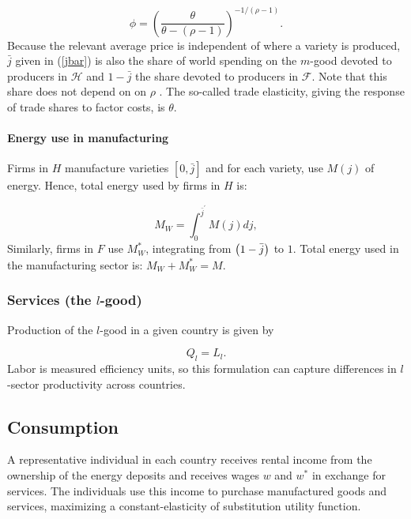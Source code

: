 \documentclass[notitlepage,12pt]{article}
\begin{document}
\begin{equation*}
\phi =\left( \frac{\theta }{\theta -\left( \rho -1\right) }\right)
^{-1/\left( \rho -1\right) }.
\end{equation*}%
Because the relevant average price is independent of where a variety is
produced, $\bar{j}$ given in (\ref{jbar}) is also the share of world
spending on the $m$-good devoted to producers in $\mathcal{H}$ and $1-\bar{j}
$ the share devoted to producers in $\mathcal{F}$. Note that this share does
not depend on on $\rho $ . The so-called trade elasticity, giving the
response of trade shares to factor costs, is $\theta $.

\paragraph{Energy use in manufacturing}

Firms in $H$ manufacture varieties $\left[ 0,\bar{j}\right] $ and for each
variety, use $M\left( j\right) $ of energy. Hence, total energy used by
firms in $H$ is:

\begin{equation*}
M_{W}=\int_{0}^{\bar{j}^{\prime }}M\left( j\right) dj,
\end{equation*}%
Similarly, firms in $F$ use $M_{W}^{\ast }$, integrating from $\left( 1-\bar{%
j}\right) $ to $1$. Total energy used in the manufacturing sector is: $%
M_{W}+M_{W}^{\ast }=M.$

\subsubsection{Services (the $l$-good)}

Production of the $l$-good in a given country is given by

\begin{equation*}
Q_{l}=L_{l}.
\end{equation*}%
Labor is measured efficiency units, so this formulation can capture
differences in $l$-sector productivity across countries.

\subsection{Consumption}

A representative individual in each country receives rental income from the
ownership of the energy deposits and receives wages $w$ and $w^{\ast }$ in
exchange for services. The individuals use this income to purchase
manufactured goods and services, maximizing a constant-elasticity of
substitution utility function.
\end{document}

